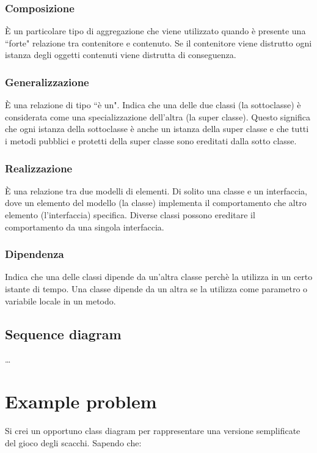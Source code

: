 \documentclass{article}
\begin{document}
\subsubsection{Composizione}
\`E un particolare tipo di aggregazione che viene utilizzato quando \`e presente una ``forte" relazione tra contenitore e contenuto. Se il contenitore viene distrutto ogni istanza degli oggetti contenuti viene distrutta di conseguenza.

\subsubsection{Generalizzazione}
\`E una relazione di tipo ``\`e un". Indica che una delle due classi (la sottoclasse) \`e considerata come una specializzazione dell'altra (la super classe). Questo significa che ogni istanza della sottoclasse \`e anche un istanza della super classe e che tutti i metodi pubblici e protetti della super classe sono ereditati dalla sotto classe.

\subsubsection{Realizzazione}
\`E una relazione tra due modelli di elementi. Di solito una classe e un interfaccia, dove un elemento del modello (la classe) implementa il comportamento che altro elemento (l'interfaccia) specifica. Diverse classi possono ereditare il comportamento da una singola interfaccia. 

\subsubsection{Dipendenza}
Indica che una delle classi dipende da un'altra classe perch\`e la utilizza in un certo istante di tempo. Una classe dipende da un altra se la utilizza come parametro o variabile locale in un metodo.

\subsection{Sequence diagram}
\ldots

\section{Example problem}

Si crei un opportuno class diagram per rappresentare una versione semplificate del gioco degli scacchi. Sapendo che:
\end{document}
